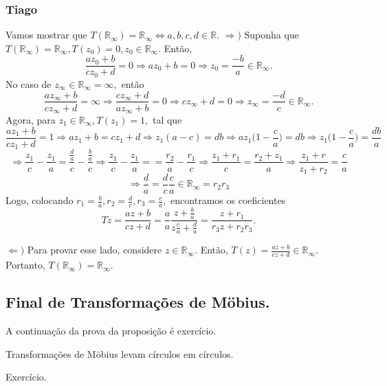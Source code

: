 \documentclass[complex.tex]{subfiles}
\begin{document}
\subsubsection{Tiago}
Vamos mostrar que $T(\mathbb{R}_\infty) = \mathbb{R}_{\infty}\Longleftrightarrow a, b, c, d\in \mathbb{R}$.
$\Rightarrow)$ Suponha que $T(\mathbb{R}_\infty) = \mathbb{R}_\infty, T(z_{0}) = 0, z_{0}\in \mathbb{R}_\infty.$ Então,
$$
	\frac{az_{0} + b}{cz_{0} + d} = 0\Rightarrow az_{0} + b = 0\Rightarrow z_{0} = \frac{-b}{a}\in \mathbb{R}_\infty.
$$
No caso de $z_\infty \in \mathbb{R}_\infty = \infty, $ então
$$
	\frac{az_{\infty} + b}{cz_{\infty} + d} = \infty\Rightarrow \frac{cz_{\infty} + d}{az_{\infty} + b} = 0\Rightarrow cz_\infty + d = 0
	\Rightarrow z_\infty = \frac{-d}{c}\in \mathbb{R}_\infty.
$$
Agora, para $z_{1}\in \mathbb{R}_{\infty}, T(z_{1}) = 1,$ tal que
$$
	\frac{az_{1} + b}{cz_{1} + d} = 1\Rightarrow az_{1} + b = cz_{1} + d\Rightarrow z_{1}(a - c) = db\Rightarrow az_{1}\biggl(1 - \frac{c}{a}\biggr) = db
	\Rightarrow z_{1}\biggl(1 - \frac{c}{a}\biggr) = \frac{db}{a}
$$
$$
	\Rightarrow \frac{z_{1}}{c} - \frac{z_1}{a} = \frac{\frac{d}{a}}{c} - \frac{\frac{b}{a}}{c}\Rightarrow \frac{z_1}{c} - \frac{z_1}{a} =
	= \frac{r_2}{a} - \frac{r_1}{c}\Rightarrow \frac{z_1 + r_1}{c} = \frac{r_2 + z_1}{a}\Rightarrow \frac{z_1 + r}{z_1 + r_2} = \frac{c}{a}
$$
$$
	\Rightarrow \frac{d}{a} = \frac{d}{c}\frac{c}{a}\in \mathbb{R}_{\infty} = r_2r_3
$$
Logo, colocando $r_{1} = \frac{b}{a}, r_2 = \frac{d}{c}, r_3 = \frac{c}{a},$ encontramos os coeficientes
$$
	Tz = \frac{az + b}{cz + d} = \frac{a}{a}\frac{z + \frac{b}{a}}{z \frac{c}{a} + \frac{d}{a}} = \frac{z + r_1}{r_3z + r_2r_3}.
$$

$\Leftarrow)$ Para provar esse lado, considere $z\in \mathbb{R}_\infty.$ Então, $T(z) = \frac{az + b}{cz + d}\in \mathbb{R}_\infty.$ Portanto,
$T(\mathbb{R}_\infty) = \mathbb{R}_\infty.$  \qedsymbol

\subsection{Final de Transformações de M\"{o}bius.}
A continuação da prova da proposição é exercício.
\begin{theorem*}
	Transformações de M\"{o}bius levam círculos em círculos.
\end{theorem*}
\begin{proof*}
	Exercício.
\end{proof*}
\end{document}
